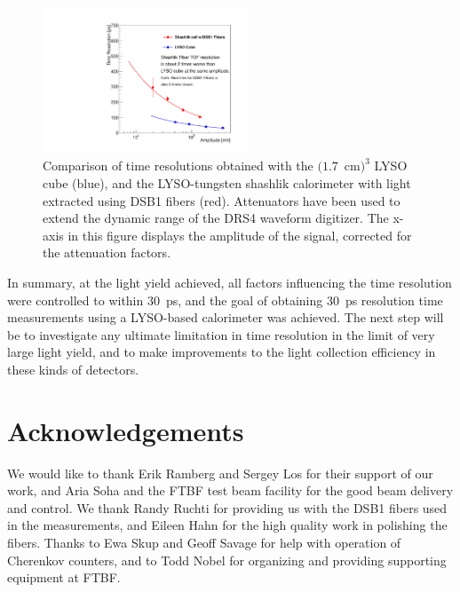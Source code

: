 \documentclass[12pt]{article}
\begin{document}
\begin{figure}[H] \centering
\includegraphics[width=0.55\textwidth]{figs/TimeResolutionVsEnergy_ShashlikDSB1FiberAndCube} 
\caption{Comparison of time resolutions obtained with the $(1.7$~cm$)^{3}$ LYSO cube (blue), 
and the LYSO-tungsten shashlik calorimeter with light extracted using DSB1 fibers (red). 
Attenuators have been used to extend the dynamic range of the
DRS4 waveform digitizer. The x-axis in this figure displays the amplitude of the
signal, corrected for the attenuation factors. }
\label{fig:ShashlikFiberAndCubeTOF}
\end{figure}

In summary, at the light yield achieved, all factors influencing the time
resolution were controlled to within $30$~ps, and the goal of obtaining $30$~ps
resolution time measurements using a LYSO-based calorimeter was achieved. The
next step will be to investigate any ultimate limitation in time resolution in
the limit of very large light yield, and to make improvements to the light
collection efficiency in these kinds of detectors.

\section{Acknowledgements} We would like to thank Erik Ramberg and Sergey Los
for their support of our work, and Aria Soha and the FTBF test beam facility for
the good beam delivery and control. We thank Randy Ruchti for providing us with
the DSB1 fibers used in the measurements, and Eileen Hahn for the high quality
work in polishing the fibers. Thanks to Ewa Skup and Geoff Savage for help with
operation of Cherenkov counters, and to Todd Nobel for organizing and providing
supporting equipment at FTBF.


{}

\end{document}
